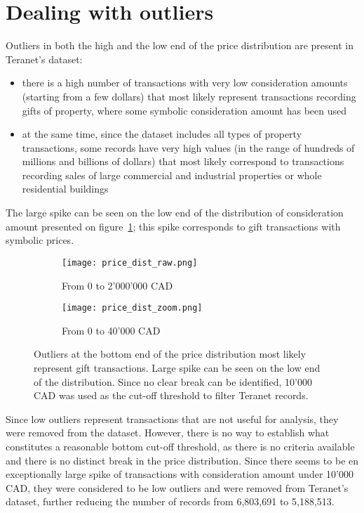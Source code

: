 \section{Dealing with outliers} \label{sec:outliers}


Outliers in both the high and the low end of the price distribution are present in Teranet's dataset:
\begin{itemize}
    \item there is a high number of transactions with very low consideration amounts (starting from a few dollars) that most likely represent transactions recording gifts of property, where some symbolic consideration amount has been used
    \item at the same time, since the dataset includes all types of property transactions, some records have very high values (in the range of hundreds of millions and billions of dollars) that most likely correspond to transactions recording sales of large commercial and industrial properties or whole residential buildings
\end{itemize}

The large spike can be seen on the low end of the distribution of consideration amount presented on figure~\ref{fig:bottom_outliers}; this spike corresponds to gift transactions with symbolic prices.

\begin{figure}[ht]
    \centering
    \begin{subfigure}{\linewidth}
        \centering
        \texttt{[image: price\_dist\_raw.png]}
        \caption{From 0 to 2'000'000 CAD}
    \end{subfigure}

    \begin{subfigure}{\linewidth}
        \centering
        \texttt{[image: price\_dist\_zoom.png]}
        \caption{From 0 to 40'000 CAD}
    \end{subfigure}
    \caption{Outliers at the bottom end of the price distribution most likely represent gift transactions.
    Large spike can be seen on the low end of the distribution.
    Since no clear break can be identified, 10'000 CAD was used as the cut-off threshold to filter Teranet records.}
    \label{fig:bottom_outliers}
\end{figure}

Since low outliers represent transactions that are not useful for analysis, they were removed from the dataset.
However, there is no way to establish what constitutes a reasonable bottom cut-off threshold, as there is no criteria available and there is no distinct break in the price distribution.
Since there seems to be en exceptionally large spike of transactions with consideration amount under 10'000 CAD, they were considered to be low outliers and were removed from Teranet's dataset, further reducing the number of records from 6,803,691 to 5,188,513.

